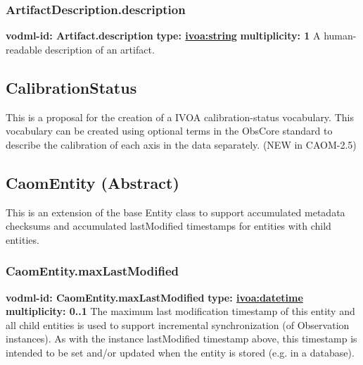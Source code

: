     \subsubsection{ArtifactDescription.description}
      \textbf{vodml-id: Artifact.description} \newline
      \textbf{type: \hyperref[sect:ivoa]{ivoa:string}} \newline
      \textbf{multiplicity: 1} \newline
      A human-readable description of an artifact.

  \subsection{CalibrationStatus}
  \label{sect:CalibrationStatus}
    This is a proposal for the creation of a IVOA calibration-status vocabulary. This vocabulary can be created using optional terms in the ObsCore standard to describe the calibration of each axis in the data separately. (NEW in CAOM-2.5)

  \subsection{CaomEntity (Abstract)}
  \label{sect:CaomEntity}
    This is an extension of the base Entity class to support accumulated metadata checksums and accumulated lastModified timestamps for entities with child entities.

    \subsubsection{CaomEntity.maxLastModified}
      \textbf{vodml-id: CaomEntity.maxLastModified} \newline
      \textbf{type: \hyperref[sect:ivoa]{ivoa:datetime}} \newline
      \textbf{multiplicity: 0..1} \newline
      The maximum last modification timestamp of this entity and all child entities is used to support incremental synchronization (of Observation instances). As with the instance lastModified timestamp above, this timestamp is intended to be set and/or updated when the entity is stored (e.g. in a database).

